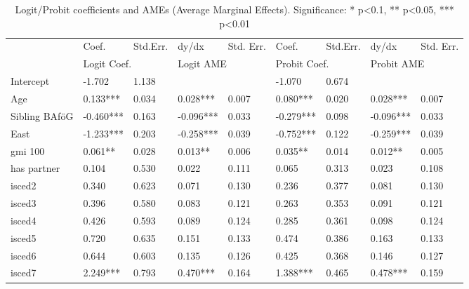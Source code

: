 \begin{table}
\footnotesize
\caption{Logit/Probit coefficients and AMEs (Average Marginal Effects). Significance: * p<0.1, ** p<0.05, *** p<0.01}
\label{tab:logit-probit-ame}
\begin{tabular}{lllllllll}
\toprule
                        & Coef.    & Std.Err.  & dy/dx      & Std. Err.  & Coef.     & Std.Err.   & dy/dx      & Std. Err. \\
                        & \multicolumn{2}{l}{Logit Coef.} & \multicolumn{2}{l}{Logit AME} & \multicolumn{2}{l}{Probit Coef.} & \multicolumn{2}{l}{Probit AME} \\
\midrule
Intercept               & -1.702    & 1.138     &            &            & -1.070    & 0.674      &            &           \\
Age                     & 0.133***  & 0.034     & 0.028***   & 0.007      & 0.080***  & 0.020      & 0.028***   & 0.007     \\
Sibling BAföG           & -0.460*** & 0.163     & -0.096***  & 0.033      & -0.279*** & 0.098      & -0.096***  & 0.033     \\
East                    & -1.233*** & 0.203     & -0.258***  & 0.039      & -0.752*** & 0.122      & -0.259***  & 0.039     \\
gmi 100                 & 0.061**   & 0.028     & 0.013**    & 0.006      & 0.035**   & 0.014      & 0.012**    & 0.005     \\
has partner             & 0.104     & 0.530     & 0.022      & 0.111      & 0.065     & 0.313      & 0.023      & 0.108     \\
isced2                  & 0.340     & 0.623     & 0.071      & 0.130      & 0.236     & 0.377      & 0.081      & 0.130     \\
isced3                  & 0.396     & 0.580     & 0.083      & 0.121      & 0.263     & 0.353      & 0.091      & 0.121     \\
isced4                  & 0.426     & 0.593     & 0.089      & 0.124      & 0.285     & 0.361      & 0.098      & 0.124     \\
isced5                  & 0.720     & 0.635     & 0.151      & 0.133      & 0.474     & 0.386      & 0.163      & 0.133     \\
isced6                  & 0.644     & 0.603     & 0.135      & 0.126      & 0.425     & 0.368      & 0.146      & 0.127     \\
isced7                  & 2.249***  & 0.793     & 0.470***   & 0.164      & 1.388***  & 0.465      & 0.478***   & 0.159     \\

\end{tabular}
\end{table}
